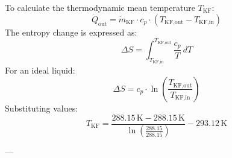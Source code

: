 To calculate the thermodynamic mean temperature \( T_{\text{KF}} \):  
\[
\dot{Q}_{\text{out}} = \dot{m}_{\text{KF}} \cdot c_p \cdot (T_{\text{KF,out}} - T_{\text{KF,in}})
\]  
The entropy change is expressed as:  
\[
\Delta S = \int_{T_{\text{KF,in}}}^{T_{\text{KF,out}}} \frac{c_p}{T} \, dT
\]  
For an ideal liquid:  
\[
\Delta S = c_p \cdot \ln \left( \frac{T_{\text{KF,out}}}{T_{\text{KF,in}}} \right)
\]  
Substituting values:  
\[
T_{\text{KF}} = \frac{288.15 \, \text{K} - 288.15 \, \text{K}}{\ln \left( \frac{288.15}{288.15} \right)} - 293.12 \, \text{K}
\]  

---